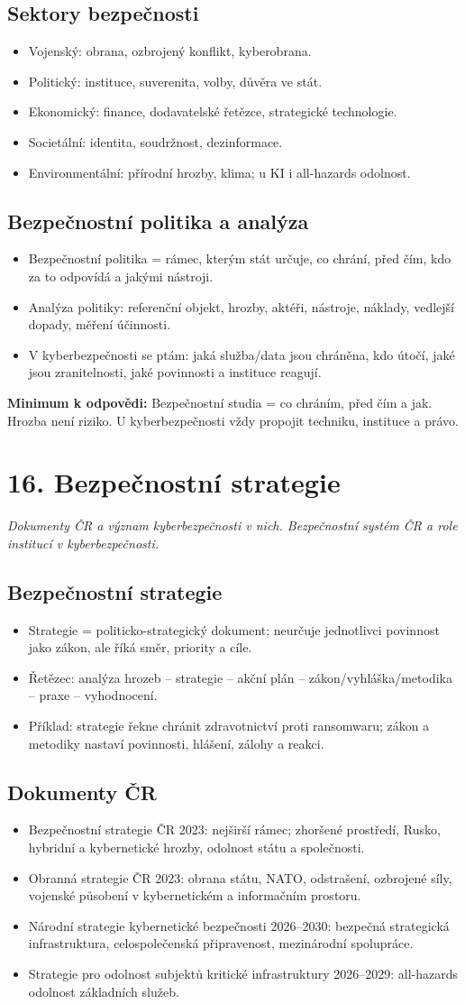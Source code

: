 \documentclass[10pt,a4paper]{article}
\newcommand{\otazka}[2]{\section*{#1}\addcontentsline{toc}{section}{#1}\textit{#2}\par\medskip}
\newcommand{\must}[1]{\colorbox{blue!7}{\parbox{\dimexpr\linewidth-2\fboxsep}{\textbf{Minimum k odpovědi:} #1}}\par\medskip}
\newcommand{\blok}[1]{\subsection*{#1}}
\begin{document}
\blok{Sektory bezpečnosti}
\begin{itemize}
  \item Vojenský: obrana, ozbrojený konflikt, kyberobrana.
  \item Politický: instituce, suverenita, volby, důvěra ve stát.
  \item Ekonomický: finance, dodavatelské řetězce, strategické technologie.
  \item Societální: identita, soudržnost, dezinformace.
  \item Environmentální: přírodní hrozby, klima; u KI i all-hazards odolnost.
\end{itemize}

\blok{Bezpečnostní politika a analýza}
\begin{itemize}
  \item Bezpečnostní politika = rámec, kterým stát určuje, co chrání, před čím, kdo za to odpovídá a jakými nástroji.
  \item Analýza politiky: referenční objekt, hrozby, aktéři, nástroje, náklady, vedlejší dopady, měření účinnosti.
  \item V kyberbezpečnosti se ptám: jaká služba/data jsou chráněna, kdo útočí, jaké jsou zranitelnosti, jaké povinnosti a instituce reagují.
\end{itemize}

\must{Bezpečnostní studia = co chráním, před čím a jak. Hrozba není riziko. U kyberbezpečnosti vždy propojit techniku, instituce a právo.}

\newpage

\otazka{16. Bezpečnostní strategie}{Dokumenty ČR a význam kyberbezpečnosti v nich. Bezpečnostní systém ČR a role institucí v kyberbezpečnosti.}

\blok{Bezpečnostní strategie}
\begin{itemize}
  \item Strategie = politicko-strategický dokument; neurčuje jednotlivci povinnost jako zákon, ale říká směr, priority a cíle.
  \item Řetězec: analýza hrozeb -- strategie -- akční plán -- zákon/vyhláška/metodika -- praxe -- vyhodnocení.
  \item Příklad: strategie řekne chránit zdravotnictví proti ransomwaru; zákon a metodiky nastaví povinnosti, hlášení, zálohy a reakci.
\end{itemize}

\blok{Dokumenty ČR}
\begin{itemize}
  \item Bezpečnostní strategie ČR 2023: nejširší rámec; zhoršené prostředí, Rusko, hybridní a kybernetické hrozby, odolnost státu a společnosti.
  \item Obranná strategie ČR 2023: obrana státu, NATO, odstrašení, ozbrojené síly, vojenské působení v kybernetickém a informačním prostoru.
  \item Národní strategie kybernetické bezpečnosti 2026--2030: bezpečná strategická infrastruktura, celospolečenská připravenost, mezinárodní spolupráce.
  \item Strategie pro odolnost subjektů kritické infrastruktury 2026--2029: all-hazards odolnost základních služeb.
\end{itemize}
\end{document}
